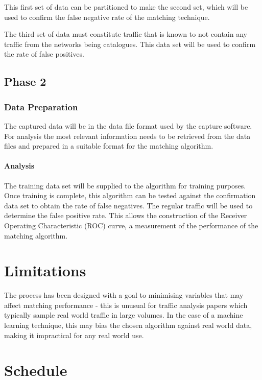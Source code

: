 \documentclass{ecuthesis}
\begin{document}
This first set of data can be partitioned to make the second set, which will be used to confirm the false negative rate of the matching technique.

The third set of data must constitute traffic that is known to not contain any traffic from the networks being catalogues. This data set will be used to confirm the rate of false positives.

\subsection{Phase 2}

\subsubsection{Data Preparation}

The captured data will be in the data file format used by the capture software. For analysis the most relevant information needs to be retrieved from the data files and prepared in a suitable format for the matching algorithm.

\paragraph{Analysis}

The training data set will be supplied to the algorithm for training purposes. Once training is complete, this algorithm can be tested against the confirmation data set to obtain the rate of false negatives. The regular traffic will be used to determine the false positive rate. This allows the construction of the Receiver Operating Characteristic (ROC) curve, a measurement of the performance of the matching algorithm.

\section{Limitations}

The process has been designed with a goal to minimising variables that may affect matching performance - this is unusual for traffic analysis papers which typically sample real world traffic in large volumes. In the case of a machine learning technique, this may bias the chosen algorithm against real world data, making it impractical for any real world use.

\section{Schedule}
\end{document}
